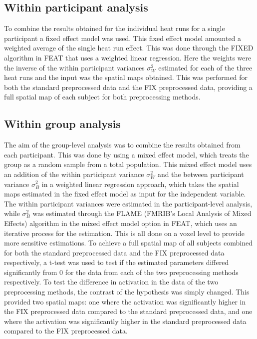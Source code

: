 \subsection{Within participant analysis}
To combine the results obtained for the individual heat runs for a single participant a fixed effect model was used. This fixed effect model amounted a weighted average of the single heat run effect. This was done through the FIXED algorithm in FEAT that uses a weighted linear regression. Here the weights were the inverse of the within participant variances $\sigma_{W}^{2}$ estimated for each of the three heat runs and the input was the spatial maps obtained. This was performed for both the standard preprocessed data and the FIX preprocessed data, providing a full spatial map of each subject for both preprocessing methods.

\subsection{Within group analysis}
The aim of the group-level analysis was to combine the results obtained from each participant. This was done by using a mixed effect model, which treats the group as a random sample from a total population. This mixed effect model uses an addition of the within participant variance $\sigma_{W}^{2}$ and the between participant variance $\sigma_{B}^{2}$ in a weighted linear regression approach, which takes the spatial maps estimated in the fixed effect model as input for the independent variable. The within participant variances were estimated in the participant-level analysis, while $\sigma_{B}^{2}$ was estimated through the FLAME (FMRIB's Local Analysis of Mixed Effects) algorithm in the mixed effect model option in FEAT, which uses an iterative process for the estimation. This is all done on a voxel level to provide more sensitive estimations.
To achieve a full spatial map of all subjects combined for both the standard preprocessed data and the FIX preprocessed data respectively, a t-test was used to test if the estimated parameters differed significantly from 0 for the data from each of the two preprocessing methods respectively. To test the difference in activation in the data of the two preprocessing methods, the contrast of the hypothesis was simply changed. This provided two spatial maps: one where the activation was significantly higher in the FIX preprocessed data compared to the standard preprocessed data, and one where the activation was significantly higher in the standard preprocessed data compared to the FIX preprocessed data. 
